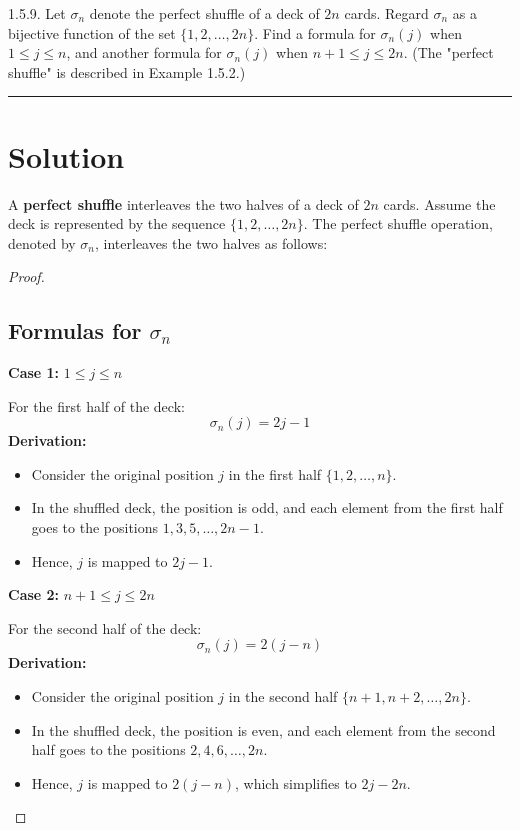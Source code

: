 \documentclass[12pt]{amsart}
\theoremstyle{definition}
\numberwithin{equation}{section}
\begin{document}
    \begin{exercise}{1.5.9.} Let \(\sigma_n\) denote the perfect shuffle of a deck of \(2n\) cards. Regard \(\sigma_n\) as a bijective function of the set \(\{1,2,\dots, 2n\}\). Find a formula for \(\sigma_n(j)\) when \(1 \leq j \leq n\), and another formula for \(\sigma_n(j)\) when \(n + 1 \leq j \leq 2n\). (The "perfect shuffle" is described in Example 1.5.2.)
        \noindent\rule{\linewidth}{1pt}
        
        \section*{Solution}
        
        A \textbf{perfect shuffle} interleaves the two halves of a deck of \(2n\) cards. Assume the deck is represented by the sequence \(\{1, 2, \ldots, 2n\}\). The perfect shuffle operation, denoted by \(\sigma_n\), interleaves the two halves as follows:
        
        \begin{proof} \( \)
        \subsection*{Formulas for \(\sigma_n\)}
    
        \textbf{Case 1:} \(1 \leq j \leq n\)
    
        For the first half of the deck:
        \[
        \sigma_n(j) = 2j - 1
        \]
        \textbf{Derivation:}
        \begin{itemize}[label=--]
            \item Consider the original position \(j\) in the first half \(\{1, 2, \ldots, n\}\).
            \item In the shuffled deck, the position is odd, and each element from the first half goes to the positions \(1, 3, 5, \ldots, 2n-1\).
            \item Hence, \(j\) is mapped to \(2j - 1\).
        \end{itemize}
    
        \textbf{Case 2:} \(n + 1 \leq j \leq 2n\)
    
        For the second half of the deck:
        \[
        \sigma_n(j) = 2(j - n)
        \]
        \textbf{Derivation:}
        \begin{itemize}[label=--]
            \item Consider the original position \(j\) in the second half \(\{n+1, n+2, \ldots, 2n\}\).
            \item In the shuffled deck, the position is even, and each element from the second half goes to the positions \(2, 4, 6, \ldots, 2n\).
            \item Hence, \(j\) is mapped to \(2(j - n)\), which simplifies to \(2j - 2n\).
        \end{itemize}
    

\end{proof}
\end{exercise}
\end{document}
